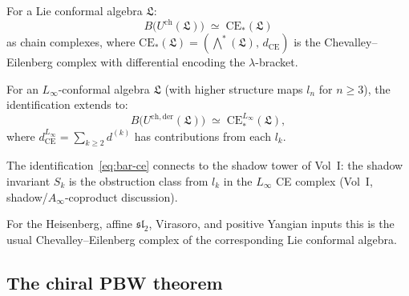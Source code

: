 \begin{proposition}
\label{prop:bar-ce-chiral}
For a Lie conformal algebra $\mathfrak{L}$:
\begin{equation}\label{eq:bar-ce}
 B\bigl(U^{\mathrm{ch}}(\mathfrak{L})\bigr) \;\simeq\; \mathrm{CE}_*(\mathfrak{L})
\end{equation}
as chain complexes, where $\mathrm{CE}_*(\mathfrak{L}) = (\bigwedge^*(\mathfrak{L}),\, d_{\mathrm{CE}})$ is the Chevalley--Eilenberg complex with differential encoding the $\lambda$-bracket.

For an $L_\infty$-conformal algebra $\mathfrak{L}$ (with higher structure maps $l_n$ for $n \geq 3$), the identification extends to:
\begin{equation}\label{eq:bar-ce-linfty}
 B\bigl(U^{\mathrm{ch,der}}(\mathfrak{L})\bigr) \;\simeq\; \mathrm{CE}_*^{L_\infty}(\mathfrak{L}),
\end{equation}
where $d_{\mathrm{CE}}^{L_\infty} = \sum_{k \geq 2} d^{(k)}$ has contributions from each $l_k$.

The identification~\eqref{eq:bar-ce} connects to the shadow tower of Vol~I: the shadow invariant $S_k$ is the obstruction class from $l_k$ in the $L_\infty$ CE complex \textup{(}Vol~I, shadow/$A_\infty$-coproduct discussion\textup{).}

For the Heisenberg, affine \(\mathfrak{sl}_2\), Virasoro, and positive
Yangian inputs this is the usual Chevalley--Eilenberg complex of the
corresponding Lie conformal algebra.
\end{proposition}


\subsection{The chiral PBW theorem}
\label{subsec:chiral-pbw}


